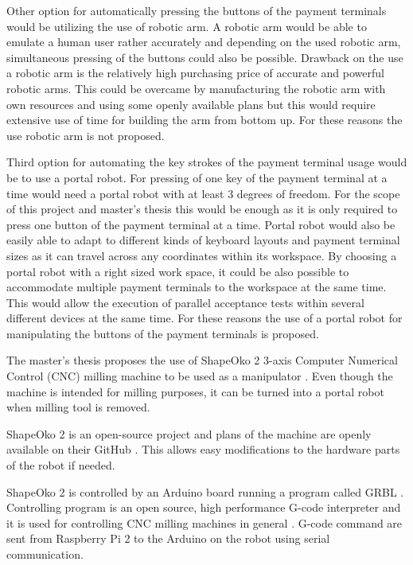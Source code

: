 Other option for automatically pressing the buttons of the payment terminals would be utilizing the use of robotic arm. A robotic arm would be able to emulate a human user rather accurately and depending on the used robotic arm, simultaneous pressing of the buttons could also be possible. Drawback on the use a robotic arm is the relatively high purchasing price of accurate and powerful robotic arms. This could be overcame by manufacturing the robotic arm with own resources and using some openly available plans \emph{\citep{bcn3d}} but this would require extensive use of time for building the arm from bottom up. For these reasons the use robotic arm is not proposed.

Third option for automating the key strokes of the payment terminal usage would be to use a portal robot. For pressing of one key of the payment terminal at a time would need a portal robot with at least 3 degrees of freedom. For the scope of this project and master's thesis this would be enough as it is only required to press one button of the payment terminal at a time. Portal robot would also be easily able to adapt to different kinds of keyboard layouts and payment terminal sizes as it can travel across any coordinates within its workspace. By choosing a portal robot with a right sized work space, it could be also possible to accommodate multiple payment terminals to the workspace at the same time. This would allow the execution of parallel acceptance tests within several different devices at the same time. For these reasons the use of a portal robot for manipulating the buttons of the payment terminals is proposed.

The master's thesis proposes the use of ShapeOko 2 3-axis Computer Numerical Control (CNC) milling machine to be used as a manipulator \emph{\citep{shapeoko}}. Even though the machine is intended for milling purposes, it can be turned into a portal robot when milling tool is removed.

ShapeOko 2 is an open-source project and plans of the machine are openly available on their GitHub \emph{\citep{shapeoko_git}}. This allows easy modifications to the hardware parts of the robot if needed.

ShapeOko 2 is controlled by an Arduino board running a program called GRBL \emph{\citep{grbl}}. Controlling program is an open source, high performance G-code interpreter and it is used for controlling CNC milling machines in general \emph{\citep{shapeoko}}. G-code command are sent from Raspberry Pi 2 to the Arduino on the robot using serial communication.


